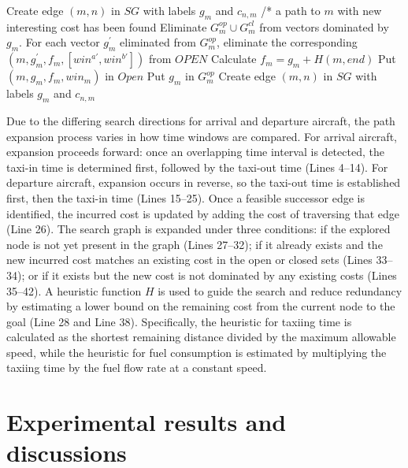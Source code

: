 \documentclass{article}
\begin{document}
\begin{algorithm}
{                {
                Create edge $(m,n)$ in $SG$ with labels $g_m$ and $c_{n,m}$ \;
                }
                {
                /* a path to $m$ with new interesting cost has been found \;
                Eliminate $G_{m}^{op} \cup G_{m}^{cl}$ from vectors dominated by $g_m$. For each vector $g_m^{'}$ eliminated from $G_{m}^{op}$, eliminate the corresponding $(m,g_m^{'},f_m,[win^{a'},win^{b'}])$ from $OPEN$ \;
                 Calculate $f_m=g_m+H(m,end)$ \;
                    {
                    Put $(m,g_m,f_m,win_m)$ in $Open$ \;
                    Put $g_m$ in $G_{m}^{op}$ \;
                    Create edge $(m,n)$ in $SG$ with labels $g_m$ and $c_{n,m}$ \;
                    }
                }
            }
\end{algorithm}

Due to the differing search directions for arrival and departure aircraft, the path expansion process varies in how time windows are compared. For arrival aircraft, expansion proceeds forward: once an overlapping time interval is detected, the taxi-in time is determined first, followed by the taxi-out time (Lines 4–14). For departure aircraft, expansion occurs in reverse, so the taxi-out time is established first, then the taxi-in time (Lines 15–25). Once a feasible successor edge is identified, the incurred cost is updated by adding the cost of traversing that edge (Line 26). The search graph is expanded under three conditions: if the explored node is not yet present in the graph (Lines 27–32); if it already exists and the new incurred cost matches an existing cost in the open or closed sets (Lines 33–34); or if it exists but the new cost is not dominated by any existing costs (Lines 35–42). A heuristic function 
$H$ is used to guide the search and reduce redundancy by estimating a lower bound on the remaining cost from the current node to the goal (Line 28 and Line 38). Specifically, the heuristic for taxiing time is calculated as the shortest remaining distance divided by the maximum allowable speed, while the heuristic for fuel consumption is estimated by multiplying the taxiing time by the fuel flow rate at a constant speed.

\section{Experimental results and discussions}
\end{document}
